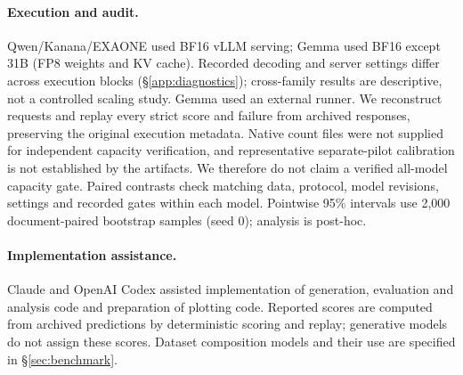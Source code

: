 \paragraph{Execution and audit.}
Qwen/Kanana/EXAONE used BF16 vLLM serving; Gemma used BF16 except 31B (FP8 weights and KV cache). Recorded decoding and server settings differ across execution blocks (\S\ref{app:diagnostics}); cross-family results are descriptive, not a controlled scaling study. Gemma used an external runner. We reconstruct requests and replay every strict score and failure from archived responses, preserving the original execution metadata. Native count files were not supplied for independent capacity verification, and representative separate-pilot calibration is not established by the artifacts. We therefore do not claim a verified all-model capacity gate. Paired contrasts check matching data, protocol, model revisions, settings and recorded gates within each model. Pointwise 95\% intervals use 2,000 document-paired bootstrap samples (seed 0); analysis is post-hoc.

\paragraph{Implementation assistance.}
Claude and OpenAI Codex assisted implementation of generation, evaluation and analysis code and preparation of plotting code. Reported scores are computed from archived predictions by deterministic scoring and replay; generative models do not assign these scores. Dataset composition models and their use are specified in \S\ref{sec:benchmark}.

